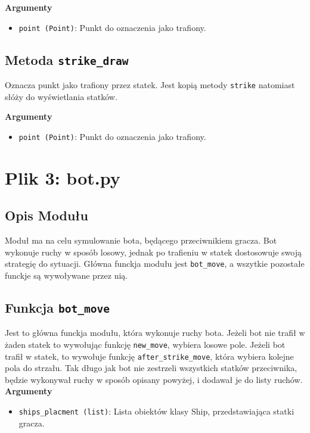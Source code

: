 \documentclass[12pt]{article}
\begin{document}
        \textbf{Argumenty}
        \begin{itemize}
            \item \texttt{point (Point)}: Punkt do oznaczenia jako trafiony.
        \end{itemize}


    \subsection{Metoda \texttt{strike\_draw}}
        Oznacza punkt jako trafiony przez statek. Jest kopią metody \texttt{strike} natomiast słóży do wyświetlania statków.

        \textbf{Argumenty}
            \begin{itemize}
                \item \texttt{point (Point)}: Punkt do oznaczenia jako trafiony.
            \end{itemize}




\section{Plik 3: bot.py}
    \subsection{Opis Modułu}
        Moduł ma na celu symulowanie bota, będącego przeciwnikiem gracza. Bot wykonuje ruchy w sposób losowy, 
        jednak po trafieniu w statek dostosowuje swoją strategię do sytuacji. Główna funckja modułu jest \texttt{bot\_move}, a wszytkie
        pozostałe funckje są wywoływane przez nią.

    \subsection{Funkcja \texttt{bot\_move}}
        Jest to główna funckja modułu, która wykonuje ruchy bota. Jeżeli bot nie trafił w żaden statek to wywołując 
        funkcję \texttt{new\_move}, wybiera losowe pole. Jeżeli bot trafił w statek, to wywołuje funkcję \texttt{after\_strike\_move},
        która wybiera kolejne pola do strzału. Tak długo jak bot nie zestrzeli wszystkich statków przeciwnika, 
        będzie wykonywał ruchy w sposób opisany powyżej, i dodawał je do listy ruchów.\\
        \textbf{Argumenty}
            \begin{itemize}
                \item \texttt{ships\_placment (list)}: Lista obiektów klasy Ship, przedstawiająca statki gracza.
            \end{itemize}
\end{document}
